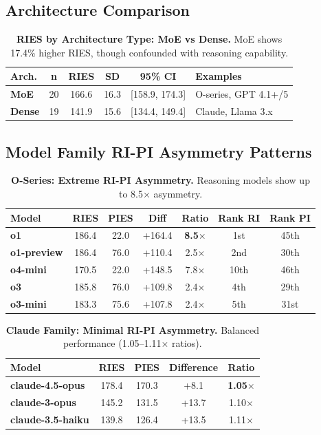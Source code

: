 \documentclass{article}
\begin{document}
\subsection{Architecture Comparison}

\begin{table}[t]
\centering
\small
\caption{\textbf{RIES by Architecture Type: MoE vs Dense.} MoE shows 17.4\% higher RIES, though confounded with reasoning capability.}
\label{tab:moe_dense_appendix}
\setlength{\tabcolsep}{3pt}
\begin{tabular}{@{}lccccp{2.8cm}@{}}
\toprule
Arch. & n & RIES & SD & 95\% CI & Examples \\
\midrule
\textbf{MoE} & 20 & 166.6 & 16.3 & [158.9, 174.3] & O-series, GPT 4.1+/5 \\
\textbf{Dense} & 19 & 141.9 & 15.6 & [134.4, 149.4] & Claude, Llama 3.x \\
\bottomrule
\end{tabular}
\end{table}

\subsection{Model Family RI-PI Asymmetry Patterns}

\begin{table}[t]
\centering
\small
\caption{\textbf{O-Series: Extreme RI-PI Asymmetry.} Reasoning models show up to 8.5$\times$ asymmetry.}
\label{tab:oseries_appendix}
\begin{tabular}{lcccccc}
\toprule
Model & RIES & PIES & Diff & Ratio & Rank RI & Rank PI \\
\midrule
\textbf{o1} & 186.4 & 22.0 & +164.4 & \textbf{8.5$\times$} & 1st & 45th \\
\textbf{o1-preview} & 186.4 & 76.0 & +110.4 & 2.5$\times$ & 2nd & 30th \\
\textbf{o4-mini} & 170.5 & 22.0 & +148.5 & 7.8$\times$ & 10th & 46th \\
\textbf{o3} & 185.8 & 76.0 & +109.8 & 2.4$\times$ & 4th & 29th \\
\textbf{o3-mini} & 183.3 & 75.6 & +107.8 & 2.4$\times$ & 5th & 31st \\
\bottomrule
\end{tabular}
\end{table}

\begin{table}[t]
\centering
\small
\caption{\textbf{Claude Family: Minimal RI-PI Asymmetry.} Balanced performance (1.05--1.11$\times$ ratios).}
\label{tab:claude_appendix}
\begin{tabular}{lcccc}
\toprule
Model & RIES & PIES & Difference & Ratio \\
\midrule
\textbf{claude-4.5-opus} & 178.4 & 170.3 & +8.1 & \textbf{1.05$\times$} \\
\textbf{claude-3-opus} & 145.2 & 131.5 & +13.7 & 1.10$\times$ \\
\textbf{claude-3.5-haiku} & 139.8 & 126.4 & +13.5 & 1.11$\times$ \\
\bottomrule
\end{tabular}
\end{table}
\end{document}
